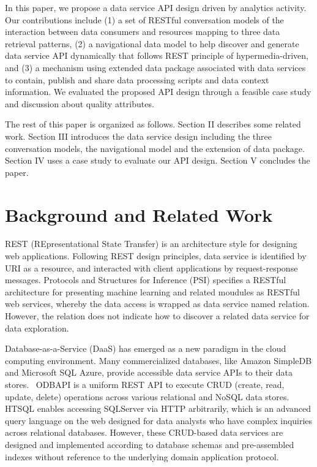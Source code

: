 \documentclass[10pt, conference, compsocconf]{IEEEtran}
\begin{document}
In this paper, we propose a data service API design driven by analytics activity. Our contributions include (1) a set of RESTful conversation models of the interaction between data consumers and resources mapping to three data retrieval patterns, (2) a navigational data model to help discover and  generate data service API dynamically that follows REST principle of hypermedia-driven, and (3) a mechanism using extended data package associated with data services to contain, publish and share data processing scripts and data context information. We evaluated the proposed API design through a feasible case study and discussion about quality attributes.

The rest of this paper is organized as follows. Section II describes some related work. Section III introduces the data service design including the three conversation models, the navigational model and the extension of data package. Section IV uses a case study to evaluate our API design. Section V concludes the paper.
\section{Background and Related Work}
REST (REpresentational State Transfer) \cite{fielding2000architectural} is an architecture style for designing web applications. Following REST design principles, data service is identified by URI as a resource, and interacted with client applications by request-response messages. Protocols and Structures for Inference (PSI)\cite{PSI} specifies a RESTful architecture for presenting machine learning and related moudules as RESTful web services, whereby the data access is wrapped as data service named relation. However, the relation does not indicate how to discover a related data service for data exploration.

Database-as-a-Service (DaaS) has emerged as a new paradigm in the cloud computing environment. Many commercialized databases, like Amazon SimpleDB\cite{Amazon} and Microsoft SQL Azure\cite{Azure}, provide accessible data service APIs to their data stores.  ODBAPI\cite{sellami2014odbapi} is a uniform REST API to execute CRUD (create, read, update, delete) operations across various relational and NoSQL data stores. HTSQL\cite{HTSQL} enables accessing SQLServer via HTTP arbitrarily, which is an advanced query language on the web designed for data analysts who have complex inquiries across relational databases. However, these CRUD-based data services are designed and implemented according to database schemas and pre-assembled indexes without reference to the underlying domain application protocol.
\end{document}
